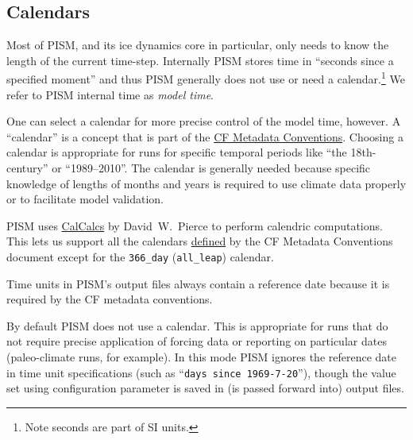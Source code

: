 \subsection{Calendars}
\label{sec:calendars}

Most of PISM, and its ice dynamics core in particular, only needs to know the length of the current time-step.  Internally PISM stores time in ``seconds since a specified moment'' and thus PISM generally does not use or need a calendar.\footnote{Note seconds are part of SI units.}  We refer to PISM internal time as \emph{model time}.

One can select a calendar for more precise control of the model time, however.  A ``calendar'' is a concept that is part of the \href{http://cf-pcmdi.llnl.gov/documents/cf-conventions/1.6/cf-conventions.html}{CF Metadata Conventions}.  Choosing a calendar is appropriate for runs for specific temporal periods like ``the 18th-century'' or ``1989--2010''.  The calendar is generally needed because  specific knowledge of lengths of months and years is required to use climate data properly or to facilitate model validation.

PISM uses \href{http://meteora.ucsd.edu/~pierce/calcalcs/index.html}{CalCalcs} by David~W.~Pierce to perform calendric computations.  This lets us support all the calendars \href{http://cf-pcmdi.llnl.gov/documents/cf-conventions/1.6/cf-conventions.html#calendar}{defined} by the CF Metadata Conventions document except for the \texttt{366_day} (\texttt{all_leap}) calendar.

Time units in PISM's output files always contain a reference date because it is required by the CF metadata conventions.

By default PISM does not use a calendar. This is appropriate for runs that do not require precise application of forcing data or reporting on particular dates (paleo-climate runs, for example).  In this mode PISM ignores the reference date in time unit specifications (such as ``\texttt{days since 1969-7-20}''), though the value set using  configuration parameter is saved in (is passed forward into) output files.

